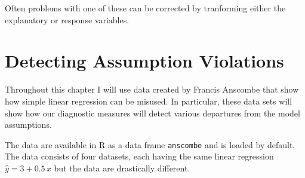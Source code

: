 \documentclass[]{book}
\theoremstyle{definition}
\theoremstyle{definition}
\theoremstyle{remark}
\begin{document}
Often problems with one of these can be corrected by tranforming either
the explanatory or response variables.

\section{Detecting Assumption
Violations}\label{detecting-assumption-violations}

Throughout this chapter I will use data created by Francis Anscombe that
show how simple linear regression can be misused. In particular, these
data sets will show how our diagnostic measures will detect various
departures from the model assumptions.

The data are available in R as a data frame \texttt{anscombe} and is
loaded by default. The data consists of four datasets, each having the
same linear regression \(\hat{y}=3+0.5\,x\) but the data are drastically
different.
\end{document}
